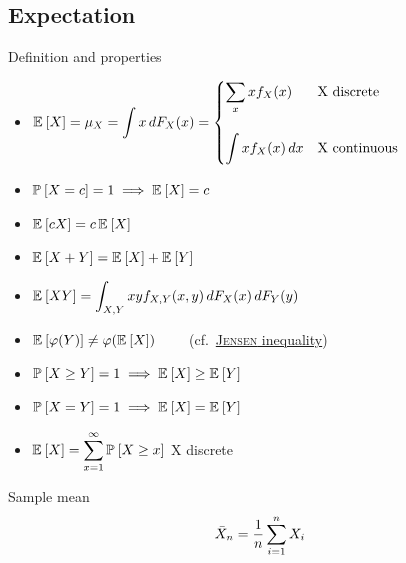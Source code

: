 \documentclass[landscape]{article}
\begin{document}
\begin{multicols*}{2}

\section{Expectation}

Definition and properties
\begin{itemize}
  \item $\E{X} = \mu_X = \displaystyle \int x \dfx =
    \begin{cases}
      \displaystyle\sum_x xf_X(x) & \text{X discrete} \\\\
      \displaystyle\int xf_X(x)\dx & \text{X continuous}
    \end{cases}$
  \item $\Pr{X=c}=1 \imp \E{X} = c$
  \item $\E{cX} = c\,\E{X}$
  \item $\E{X+Y} = \E{X}+\E{Y}$
  \item $\E{XY} = \displaystyle\int_{X,Y} xy f_{X,Y}(x,y)\dfx\dfy$
  \item $\E{\transform(Y)} \neq \transform(\E{X}) \qquad$
    (cf.~\hyperref[jensen]{\textsc{Jensen} inequality})
  \item $\Pr{X \ge Y} = 1 \imp \E{X}\ge\E{Y}$
  \item $\Pr{X=Y} = 1 \imp \E{X}=\E{Y}$
  \item $\E{X} = \displaystyle\sum_{x=1}^\infty \Pr{X\ge x}$ \qquad X discrete
\end{itemize}

Sample mean
\[\samplemean = \frac{1}{n}\sum_{i=1}^n X_i\]


\end{multicols*}
\end{document}
